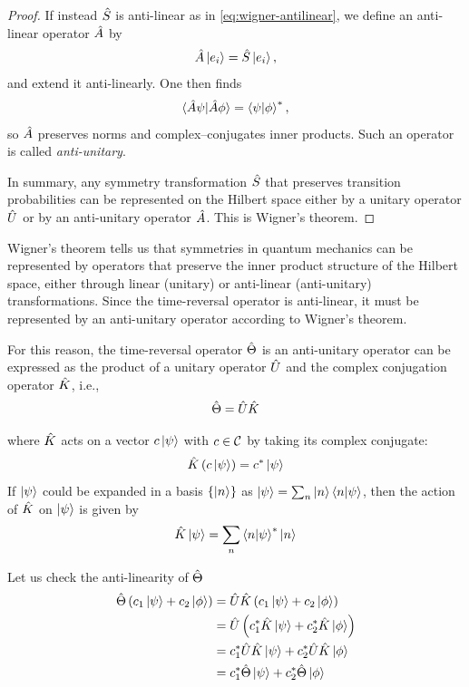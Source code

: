 \begin{proof}
    If instead $\hat{S}$ is anti-linear as in \eqref{eq:wigner-antilinear}, we define an anti-linear operator $\hat{A}$ by
    \begin{align*}
        \hat{A} \ket{e_i} = \hat{S} \ket{e_i} ,
    \end{align*}
    and extend it anti-linearly. 
    One then finds
    \begin{align*}
        \braket{\hat{A}\psi|\hat{A}\phi} = \braket{\psi|\phi}^* ,
    \end{align*}
    so $\hat{A}$ preserves norms and complex–conjugates inner products. 
    Such an operator is called \emph{anti-unitary}.

    In summary, any symmetry transformation $\hat{S}$ that preserves transition probabilities can be represented on the Hilbert space either by a unitary operator $\hat{U}$ or by an anti-unitary operator $\hat{A}$. 
    This is Wigner's theorem.
\end{proof}
Wigner's theorem tells us that symmetries in quantum mechanics can be represented by operators that preserve the inner product structure of the Hilbert space, either through linear (unitary) or anti-linear (anti-unitary) transformations. Since the time-reversal operator is anti-linear, it must be represented by an anti-unitary operator according to Wigner's theorem.

For this reason, the time-reversal operator $\hat{\Theta}$ is an anti-unitary operator can be expressed as the product of a unitary operator $\hat{U}$ and the complex conjugation operator $\hat{K}$, i.e.,
\begin{align}
    \hat{\Theta} = \hat{U} \hat{K}
\end{align}

where $\hat{K}$ acts on a vector $c\ket{\psi}$ with $c \in \mathcal{C}$ by taking its complex conjugate:
\begin{align}
    \hat{K} \left( c \ket{\psi} \right) = c^* \ket{\psi}
\end{align}
If $\ket{\psi}$ could be expanded in a basis $\{ \ket{n} \}$ as $\ket{\psi} = \sum_n \ket{n} \braket{n|\psi}$, then the action of $\hat{K}$ on $\ket{\psi}$ is given by
\begin{align}
    \hat{K} \ket{\psi} = \sum_n \braket{n|\psi}^* \ket{n} \label{eq:complex_conjugation_operator}
\end{align}

Let us check the anti-linearity of $\hat{\Theta}$
\begin{align*}
    \hat{\Theta} \left(c_1 \ket{\psi} + c_2 \ket{\phi}\right) &= \hat{U} \hat{K} \left(c_1 \ket{\psi} + c_2 \ket{\phi}\right) \\
    &= \hat{U} \left(c_1^* \hat{K} \ket{\psi} + c_2^* \hat{K} \ket{\phi}\right) \\
    &= c_1^* \hat{U} \hat{K} \ket{\psi} + c_2^* \hat{U} \hat{K} \ket{\phi} \\
    &= c_1^* \hat{\Theta} \ket{\psi} + c_2^* \hat{\Theta} \ket{\phi}
\end{align*}

